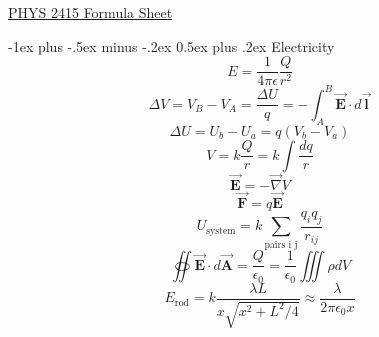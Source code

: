 \documentclass[12pt,landscape]{article}
\makeatletter
\renewcommand{\section}{\@startsection{section}{1}{0mm}%
                                {-1ex plus -.5ex minus -.2ex}%
                                {0.5ex plus .2ex}%
                                {\normalfont\large\bfseries}}
\makeatother
\begin{document}
\raggedright
\footnotesize
\begin{multicols}{4}

    \setlength{\premulticols}{1pt}
    \setlength{\postmulticols}{1pt}
    \setlength{\multicolsep}{1pt}
    \setlength{\columnsep}{2pt}
    \setlength{\mathindent}{0pt}
    \newcommand{\overbar}[1]{\mkern 1.5mu\overline{\mkern-1.5mu#1\mkern-1.5mu}\mkern 1.5mu}

    \begin{center}
        \Large{\underline{PHYS 2415 Formula Sheet}} \\
    \end{center}

    \section{Electricity}
    \begin{equation*}
        E = \frac{1}{4 \pi \epsilon} \frac{Q}{r^2}
    \end{equation*}
    \begin{equation*}
        \Delta V = V_B - V_A = \frac{\Delta U}{q} = -\int_{A}^{B} \vec{\mathbf{E}} \cdot d\vec{\mathbf{l}}
    \end{equation*}
    \begin{equation*}
        \Delta U = U_b - U_a = q(V_b - V_a)
    \end{equation*}
    \begin{equation*}
        V = k\frac{Q}{r} = k \int \frac{dq}{r}
    \end{equation*}
    \begin{equation*}
        \vec{\mathbf{E}} = - \vec{\nabla} V
    \end{equation*}
    \begin{equation*}
        \vec{\mathbf{F}} = q\vec{\mathbf{E}}
    \end{equation*}
    \begin{equation*}
        U_{\text{system}} = k \sum_{\text{pairs i j}} \frac{q_i q_j}{r_{ij}}
    \end{equation*}
    \begin{equation*}
        \oiint \vec{\mathbf{E}} \cdot d \vec{\mathbf{A}} = \frac{Q}{\epsilon_0} = \frac{1}{\epsilon_0} \iiint \rho dV
    \end{equation*}
    \begin{equation*}
        E_{\text{rod}} = k \frac{\lambda L}{x \sqrt{x^2 + L^2 / 4}} \approx \frac{\lambda}{2\pi \epsilon_0 x }

\end{equation*}
\end{multicols}
\end{document}
